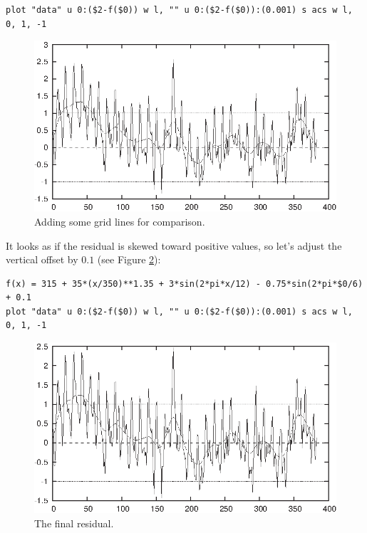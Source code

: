 \begin{verbatim}
plot "data" u 0:($2-f($0)) w l, "" u 0:($2-f($0)):(0.001) s acs w l, 0, 1, -1
\end{verbatim}
\begin{figure}[t!]
  \centerline{\includegraphics{img/session11}}
  \caption{Adding some grid lines for comparison.}
  \label{fig:session11}
\end{figure}
    
It looks as if the residual is skewed toward positive values, so let's
adjust the vertical offset by $0.1$ (see Figure \ref{fig:session12}):

\begin{verbatim}
f(x) = 315 + 35*(x/350)**1.35 + 3*sin(2*pi*x/12) - 0.75*sin(2*pi*$0/6) + 0.1
plot "data" u 0:($2-f($0)) w l, "" u 0:($2-f($0)):(0.001) s acs w l, 0, 1, -1
\end{verbatim}

\begin{figure}[t!]
  \centerline{\includegraphics{img/session12}}
  \caption{The final residual.}
  \label{fig:session12}
\end{figure}
    
